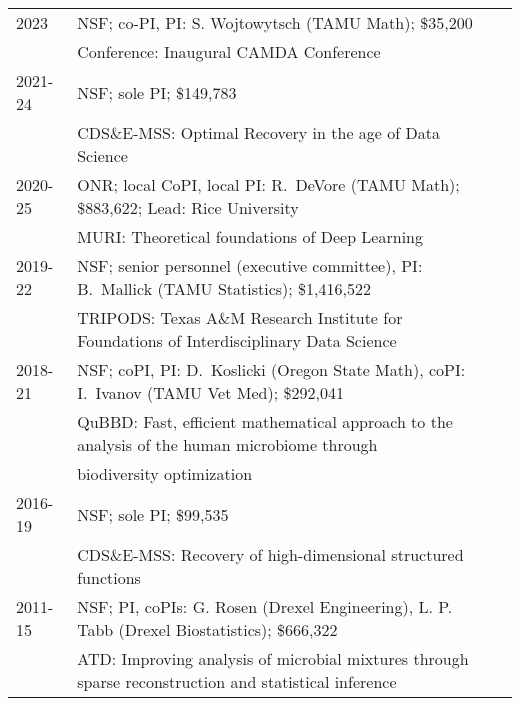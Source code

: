 \documentclass[11pt]{article}
\begin{document}
\begin{tabular}{lll}
2023 & NSF; co-PI,  PI: S. Wojtowytsch (TAMU Math); \$35,200\\
& \hspace{-15mm}
{\small Conference:} Inaugural CAMDA Conference\\
2021-24 & NSF; sole PI; \$149,783\\
& \hspace{-15mm}
{\small CDS\&E-MSS:} Optimal Recovery in the age of Data Science\\
2020-25 & ONR; local CoPI, local PI: R.~DeVore (TAMU Math); \$883,622;
Lead: Rice University\\
& \hspace{-15mm}
{\small MURI:} Theoretical foundations of Deep Learning \\
2019-22 & NSF; senior personnel (executive committee), PI: B.~Mallick (TAMU  Statistics);  \$1,416,522 \\
& \hspace{-15mm}
{\small TRIPODS:} Texas A\&M Research Institute for Foundations of Interdisciplinary Data Science\\
2018-21 & NSF; coPI, PI: D.~Koslicki (Oregon State Math), coPI: I.~Ivanov (TAMU Vet Med); 
\$292,041 \\
& \hspace{-15mm}
{\small QuBBD:} Fast, efficient mathematical approach to the analysis of the
human microbiome through\\ 
& \hspace{-15mm} biodiversity optimization\\
2016-19 & NSF; sole PI;
\$99,535 
\\
& \hspace{-15mm}
{\small CDS\&E-MSS:} Recovery of high-dimensional structured functions
\\
2011-15 & NSF; PI, coPIs: G. Rosen (Drexel Engineering), L. P. Tabb (Drexel Biostatistics); 
\$666,322\\
& \hspace{-15mm}
{\small ATD:} Improving analysis of microbial mixtures through sparse
reconstruction and statistical inference
\end{tabular}
\end{document}
